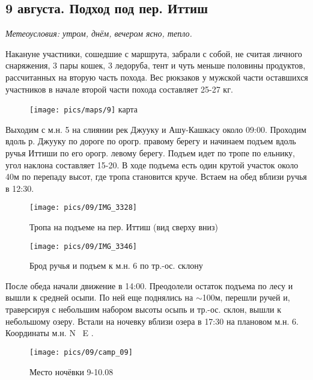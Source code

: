 \subsection{9 августа. Подход под пер. Иттиш}
\textit{Метеоусловия: утром, днём, вечером ясно, тепло.}

Накануне участники, сошедшие с маршрута, забрали с собой, не считая личного снаряжения, 3 пары кошек, 3 ледоруба, тент и чуть меньше половины продуктов, рассчитанных на вторую часть похода. Вес рюкзаков у мужской части оставшихся участников в начале второй части похода составляет 25-27 кг.

\begin{figure}[h!]
	\centering
	\texttt{[image: pics/maps/9]}
	\alert{карта}
	\label{fig:mini_9}
\end{figure}

Выходим с м.н. 5 на слиянии рек Джууку и Ашу-Кашкасу \alert{около 09:00}. Проходим вдоль р. Джууку по дороге по орогр. правому берегу и начинаем подъем вдоль ручья Иттиши по его орогр. левому берегу. Подъем идет по тропе по ельнику, угол наклона составляет 15-20\degree. В ходе подъема есть один крутой участок около 40м по перепаду высот, где тропа становится круче. Встаем на обед вблизи ручья \alert{в 12:30}.

\begin{figure}[h!]
	\centering
	\texttt{[image: pics/09/IMG\_3328]}
	\caption{Тропа на подъеме на пер. Иттиш (вид сверху вниз)}
	\label{fig:IMG_3328}
\end{figure}

\begin{figure}[h!]
	\centering
	\texttt{[image: pics/09/IMG\_3346]}
	\caption{Брод ручья и подъем к м.н. 6 по тр.-ос. склону}
	\label{fig:IMG_3346}
\end{figure}


После обеда начали движение в \alert{14:00}. Преодолели остаток подъема по лесу и вышли к средней осыпи. По ней еще поднялись на $\sim$100м, перешли ручей и, траверсируя с небольшим набором высоты осыпь и тр.-ос. склон, вышли к небольшому озеру. Встали на ночевку вблизи озера в \alert{17:30} на плановом м.н. 6. Координаты м.н. \alert{N \degree~E \degree}.


\begin{figure}[h!]
	\centering
	\texttt{[image: pics/09/camp\_09]} %
	\caption{Место ночёвки 9-10.08}
	\label{fig:camp_09}
\end{figure}

\clearpage